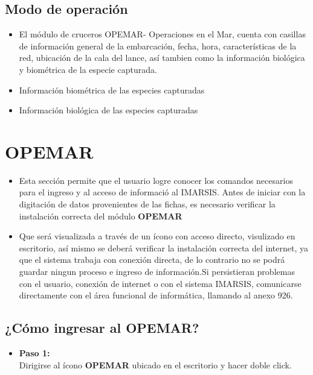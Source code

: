 \documentclass[a4paper,oneside,11pt]{book}
\begin{document}
\section{Modo de operación}

\begin{itemize}
\item [] El módulo de cruceros OPEMAR- Operaciones en el Mar, cuenta con casillas de información general de la embarcación, fecha, hora, características de la red, ubicación de la cala del lance, así tambien como la información biológica y biométrica de la especie capturada.

\item [] Información biométrica de las especies capturadas

\item [] Información biológica de las especies capturadas

\end{itemize}

 
\chapter {OPEMAR} 
\label{ch:capitulo A} 
\begin{itemize}


\item [] Esta sección permite que el usuario logre conocer los comandos necesarios para el ingreso y al acceso de informació al IMARSIS. Antes de iniciar con la digitación de datos provenientes de las fichas, es necesario verificar la instalación correcta del módulo \textbf{OPEMAR}
\item [] Que será visualizada a través de un ícono con acceso directo, visulizado en escritorio, así mismo se deberá verificar la instalación correcta del internet, ya que el sistema trabaja con conexión directa, de lo contrario no se podrá guardar ningun proceso e ingreso de información.Si persistieran problemas con el usuario, conexión de internet o  con el sistema IMARSIS, comunicarse directamente con el área funcional de informática, llamando al anexo 926. 
\end{itemize}

\section {¿Cómo ingresar al OPEMAR?}

\begin{itemize}
\item\textbf{Paso 1:}\\
Dirigirse al ícono \textbf{OPEMAR} ubicado en el escritorio y hacer doble click.
 \end{itemize}
 
\end{document}
